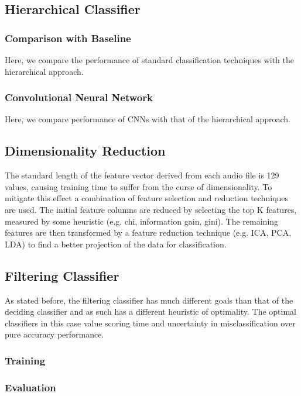 \subsection{Hierarchical Classifier}

\subsubsection{Comparison with Baseline}
Here, we compare the performance of standard classification techniques with the hierarchical approach.

\subsubsection{Convolutional Neural Network}
Here, we compare performance of CNNs with that of the hierarchical approach.


\subsection{Dimensionality Reduction}
The standard length of the feature vector derived from each audio file is 129 values, causing training time to suffer from the curse of dimensionality. To mitigate this effect a combination of feature selection and reduction techniques are used. The initial feature columns are reduced by selecting the top K features, measured by some heuristic (e.g. chi, information gain, gini). The remaining features are then transformed by a feature reduction technique (e.g. ICA, PCA, LDA) to find a better projection of the data for classification.

\subsection{Filtering Classifier}
As stated before, the filtering classifier has much different goals than that of the deciding classifier and as such has a different heuristic of optimality. The optimal classifiers in this case value scoring time and uncertainty in misclassification over pure accuracy performance.

\subsubsection{Training}

\subsubsection{Evaluation}

